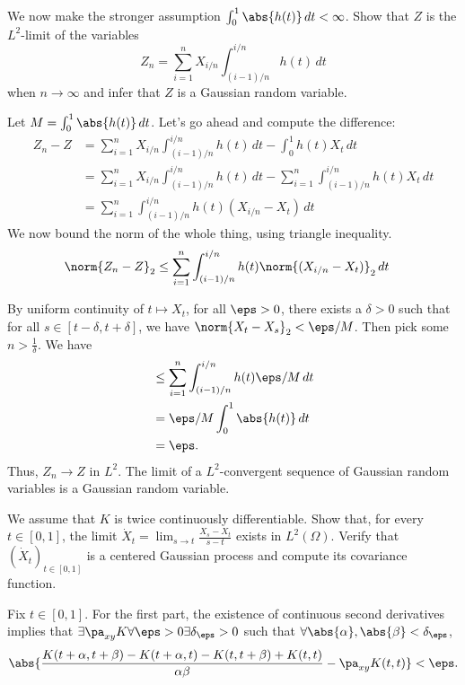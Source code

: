\documentclass{scrartcl}
\begin{document}
\begin{prob}
    We now make the stronger assumption $\int_0^1 \abs{h(t)} \, dt < \infty$. Show that $Z$ is the $L^2$-limit of the variables
    \[
        Z_n = \sum_{i=1}^n X_{i/n} \int_{(i-1)/n}^{i/n} h(t) \, dt
    \]
    when $n \to \infty$ and infer that $Z$ is a Gaussian random variable.
\end{prob}

Let $M = \int_0^1 \abs{h(t)} \, dt$. Let's go ahead and compute the difference:
\begin{align*}
    Z_n - Z &= \sum_{i=1}^n X_{i/n} \int_{(i-1)/n}^{i/n} h(t) \, dt - \int_0^1 h(t)X_t \, dt\\
    &= \sum_{i=1}^n X_{i/n} \int_{(i-1)/n}^{i/n} h(t) \, dt - \sum_{i=1}^n \int_{(i-1)/n}^{i/n} h(t)X_t \, dt\\
    &= \sum_{i=1}^n \int_{(i-1)/n}^{i/n} h(t)(X_{i/n} - X_t) \, dt
\end{align*}
We now bound the norm of the whole thing, using triangle inequality.
\begin{align*}
    \norm{Z_n - Z}_2 &\leq \sum_{i=1}^n \int_{(i-1)/n}^{i/n} h(t)\norm{(X_{i/n} - X_t)}_2 \, dt
\end{align*}

By uniform continuity of $t \mapsto X_t$, for all $\eps > 0$, there exists a $\delta > 0$ such that for all $s \in [t - \delta, t + \delta]$, we have $\norm{X_t - X_s}_2 < \eps / M$. Then pick some $n > \frac{1}{\delta}$. We have
\begin{align*}
    &\leq \sum_{i=1}^n \int_{(i-1)/n}^{i/n} h(t)\eps / M \, dt\\
    &= \eps / M \int_0^1 \abs{h(t)} \, dt\\
    &= \eps.
\end{align*}
Thus, $Z_n \to Z$ in $L^2$. The limit of a $L^2$-convergent sequence of Gaussian random variables is a Gaussian random variable.

\begin{prob}
    We assume that $K$ is twice continuously differentiable. Show that, for every $t \in [0,1]$, the limit $\dot{X}_t = \lim_{s \to t} \frac{X_s - X_t}{s-t}$ exists in $L^2(\Omega)$. Verify that $(\dot{X}_t)_{t \in [0,1]}$ is a centered Gaussian process and compute its covariance function.
\end{prob}
Fix $t\in [0,1]$. For the first part, the existence of continuous second derivatives implies that $\exists \pa_{xy}K\forall \eps > 0 \exists \delta_\eps > 0$ such that $\forall \abs{\alpha},\abs{\beta} < \delta_\eps$,
\[
    \abs{\frac{K(t + \alpha, t + \beta) - K(t + \alpha, t) - K(t, t + \beta) + K(t,t)}{\alpha\beta} - \pa_{xy} K(t,t)} < \eps.
\]
\end{document}
